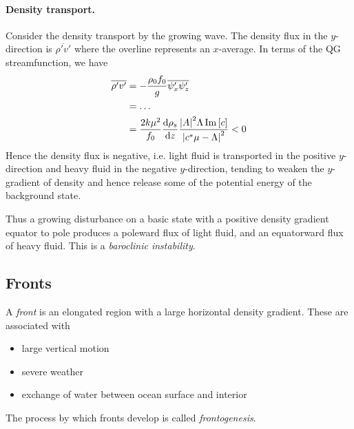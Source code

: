 \documentclass{jknotes}
\begin{document}
\paragraph{Density transport.}
Consider the density transport by the growing wave. The density flux in the
$y$-direction is $\overline{\rho' v'}$ where the overline represents an $x$-average. In
terms of the QG streamfunction, we have
\begin{align}
	\overline{\rho' v'} &= - \frac{\rho_0 f_0}{g}\overline{\psi'_x \psi'_z}\\
	&= \dots\\
	&= \frac{2k\mu^2}{f_0} \frac{\diffd \rho_s}{\diffd z} \frac{\abs{A}^2
\Lambda \Im\left[c\right]}{\abs{c^*\mu -\Lambda}^2} < 0
\end{align}
Hence the density flux is negative, i.e. light fluid is transported in the
positive $y$-direction and heavy fluid in the negative $y$-direction, tending
to weaken the $y$-gradient of density and hence release some of the potential
energy of the background state.

Thus a growing disturbance on a basic state with a positive density gradient
equator to pole produces a poleward flux of light fluid, and an equatorward
flux of heavy fluid. This is a \emph{baroclinic instability}. 

\subsection{Fronts}
A \emph{front} is an elongated region with a large horizontal density
gradient. These are associated with
\begin{itemize}
	\item large vertical motion
	\item severe weather
	\item exchange of water between ocean surface and interior
\end{itemize}

The process by which fronts develop is called \emph{frontogenesis}.
\end{document}
